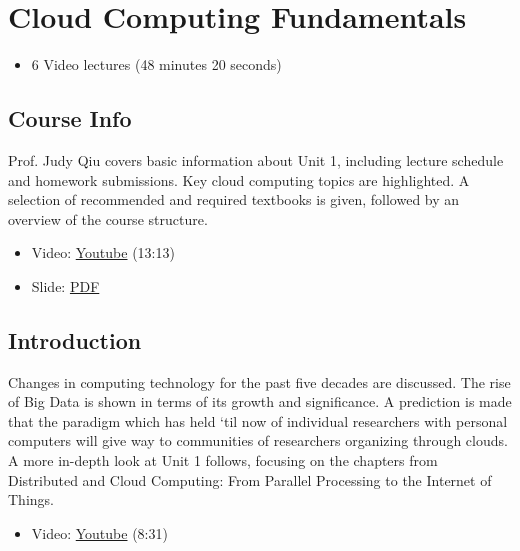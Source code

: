 \section{Cloud Computing
Fundamentals}\label{cloud-computing-fundamentals}

\begin{itemize}
\tightlist
\item
  6 Video lectures (48 minutes 20 seconds)
\end{itemize}

\subsection{Course Info}\label{course-info}

Prof. Judy Qiu covers basic information about Unit 1, including lecture
schedule and homework submissions. Key cloud computing topics are
highlighted. A selection of recommended and required textbooks is given,
followed by an overview of the course structure.

\begin{itemize}
\tightlist
\item
  Video: \href{https://www.youtube.com/watch?v=Kde5YVUwDTQ}{Youtube}
  (13:13)
\end{itemize}

\begin{itemize}
\tightlist
\item
  Slide:
  \href{https://drive.google.com/open?id=0B88HKpainTSfYjU4QzdDSms0Nk0}{PDF}
\end{itemize}

\subsection{Introduction}\label{introduction}

Changes in computing technology for the past five decades are discussed.
The rise of Big Data is shown in terms of its growth and significance. A
prediction is made that the paradigm which has held `til now of
individual researchers with personal computers will give way to
communities of researchers organizing through clouds. A more in-depth
look at Unit 1 follows, focusing on the chapters from Distributed and
Cloud Computing: From Parallel Processing to the Internet of Things.

\begin{itemize}
\tightlist
\item
  Video: \href{https://www.youtube.com/watch?v=5lKj8_nqj9k}{Youtube}
  (8:31)
\end{itemize}

